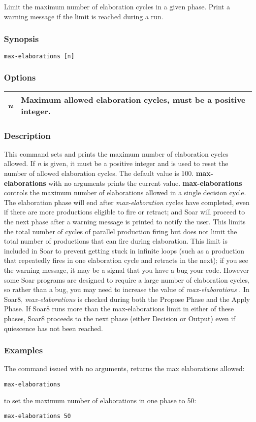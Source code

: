 \subsection{}
\label{max-elaborations}
Limit the maximum number of elaboration cycles in a given phase. Print a warning message if the limit is reached during a run. 
\subsubsection*{Synopsis}
\begin{verbatim}
max-elaborations [n]
\end{verbatim}
\subsubsection*{Options}
\begin{tabular}{|l|l|}
\hline
\emph{n}
 & Maximum allowed elaboration cycles, must be a positive integer.  \\
\hline
\end{tabular}
\subsubsection*{Description}
 This command sets and prints the maximum number of elaboration cycles allowed. If \emph{n}
 is given, it must be a positive integer and is used to reset the number of allowed elaboration cycles. The default value is 100. \textbf{max-elaborations}
 with no arguments prints the current value. 
 \textbf{max-elaborations}
 controls the maximum number of elaborations allowed in a single decision cycle. The elaboration phase will end after \emph{max-elaboration}
 cycles have completed, even if there are more productions eligible to fire or retract; and Soar will proceed to the next phase after a warning message is printed to notify the user. This limits the total number of cycles of parallel production firing but does not limit the total number of productions that can fire during elaboration. 
 This limit is included in Soar to prevent getting stuck in infinite loops (such as a production that repeatedly fires in one elaboration cycle and retracts in the next); if you see the warning message, it may be a signal that you have a bug your code. However some Soar programs are designed to require a large number of elaboration cycles, so rather than a bug, you may need to increase the value of \emph{max-elaborations}
. 
 In Soar8, \emph{max-elaborations}
 is checked during both the Propose Phase and the Apply Phase. If Soar8 runs more than the max-elaborations limit in either of these phases, Soar8 proceeds to the next phase (either Decision or Output) even if quiescence has not been reached. 
\subsubsection*{Examples}
 The command issued with no arguments, returns the max elaborations allowed: \begin{verbatim}
max-elaborations 
\end{verbatim}
 to set the maximum number of elaborations in one phase to 50: \begin{verbatim}
max-elaborations 50
\end{verbatim}
